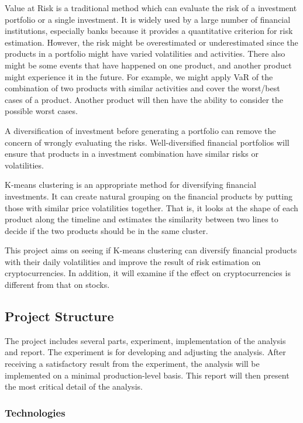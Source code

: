 \documentclass[11pt]{article} %
\theoremstyle{plain}
\theoremstyle{definition}
\begin{document}
Value at Risk is a traditional method which can evaluate the risk of a investment portfolio or a single investment. It is widely used by a large number of financial institutions, especially banks because it provides a quantitative criterion for risk estimation. However, the risk might be overestimated or underestimated since the products in a portfolio might have varied volatilities and activities. There also might be some events that have happened on one product, and another product might experience it in the future. For example, we might apply VaR of the combination of two products with similar activities and cover the worst/best cases of a product. Another product will then have the ability to consider the possible worst cases.

A diversification of investment before generating a portfolio can remove the concern of wrongly evaluating the risks. Well-diversified financial portfolios will ensure that products in a investment combination have similar risks or volatilities.

K-means clustering is an appropriate method for diversifying financial investments. It can create natural grouping on the financial products by putting those with similar price volatilities together. That is, it looks at the shape of each product along the timeline and estimates the similarity between two lines to decide if the two products should be in the same cluster.

This project aims on seeing if K-means clustering can diversify financial products with their daily volatilities and improve the result of risk estimation on cryptocurrencies. In addition, it will examine if the effect on cryptocurrencies is different from that on stocks.

\subsection{Project Structure}

The project includes several parts, experiment, implementation of the analysis and report. The experiment is for developing and adjusting the analysis. After receiving a satisfactory result from the experiment, the analysis will be implemented on a minimal production-level basis. This report will then present the most critical detail of the analysis.

\subsubsection{Technologies}
\end{document}
